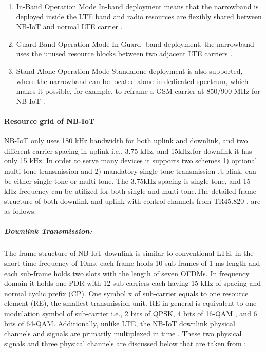 \documentclass[12pt]{article}
\begin{document}
\begin{enumerate}
    \item In-Band Operation Mode\newline
    In-band deployment means that the narrowband is deployed inside the LTE band and radio resources are flexibly shared between NB-IoT and normal LTE carrier \cite{farrell2018low}.
    \item  Guard Band Operation Mode\newline
    In Guard- band deployment, the narrowband uses the unused resource blocks between two adjacent LTE carriers \cite{farrell2018low}.
    \item Stand Alone Operation Mode\newline
    Standalone deployment is also supported, where the narrowband can be located alone in dedicated spectrum, which makes it possible, for example, to reframe a GSM carrier at 850/900 MHz for NB-IoT \cite{farrell2018low}.
\end{enumerate}

\paragraph{Resource grid of NB-IoT}
NB-IoT only uses 180 kHz bandwidth for both uplink and downlink, and two different carrier spacing in uplink i.e., 3.75 kHz, and 15kHz,for downlink it has only 15 kHz. In order to serve many devices it supports two schemes 1) optional multi-tone transmission and 2) mandatory single-tone transmission \cite{xu2017narrowband,malik2018radio}.Uplink, can be either single-tone or multi-tone. The 3.75kHz spacing is single-tone, and 15 kHz frequency can be utilized for both single and multi-tone.The detailed frame structure of both downlink and uplink with control channels from TR45.820 \cite{TR45.820,malik2018radio}, are as follows:

\subparagraph{Downlink Transmission:}
The frame structure of NB-IoT downlink is similar to conventional LTE, in the short time frequency of 10ms, each frame holds 10 sub-frames of 1 ms length and each sub-frame holds two slots with the length of seven OFDMs. In frequency domain it holds one PDR with 12 sub-carriers each having 15 kHz of spacing and normal cyclic prefix (CP). One symbol x of sub-carrier equals to one resource element (RE), the smallest transmission unit. RE in general is equivalent to one modulation symbol of sub-carrier i.e., 2 bits of QPSK, 4 bits of 16-QAM , and 6 bits of 64-QAM. Additionally, unlike LTE, the NB-IoT downlink physical channels and signals are primarily multiplexed in time \cite{malik2018radio}. These two physical signals and three physical channels are discussed below that are taken from  \cite{malik2018radio,ratasuk2016overview}:
\end{document}
